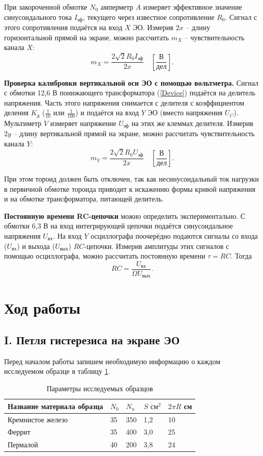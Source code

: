 \documentclass[a4paper,10pt]{article}
\begin{document}
При закороченной обмотке $N_0$ амперметр $A$ измеряет эффективное значение синусоидального тока $I_{\text{эф}}$, текущего через известное сопротивление $R_0$. Сигнал с этого сопротивления подаётся на вход $X$ ЭО. Измерив $2x$ -- длину горизонтальной прямой на экране, можно рассчитать $m_X$ -- чувствительность канала $X$:\[m_X=\frac{2\sqrt2R_0I_{\text{эф}}}{2x}\quad\left[\frac{\text{В}}{\text{дел}}\right].\]

\textbf{Проверка калибровки вертикальной оси ЭО с помощью вольтметра.} Сигнал с обмотки 12,6 В понижающего трансформатора (\ref{Device}) подаётся на делитель напряжения. Часть этого напряжения снимается с делителя с коэффициентом деления $K_{\text{д}}$ ($\frac{1}{10}$ или $\frac{1}{100}$) и подаётся на вход $Y$ ЭО (вместо напряжения $U_C$). Мультиметр $V$ измеряет напряжение $U_{\text{эф}}$ на этих же клеммах делителя. Измерив $2y$ -- длину вертикальной прямой на экране, можно рассчитать чувствительность канала $Y$:\[m_Y=\frac{2\sqrt2R_0U_{\text{эф}}}{2x}\quad\left[\frac{\text{В}}{\text{дел}}\right].\]

При этом тороид должен быть отключен, так как несинусоидальный ток нагрузки в первичной обмотке тороида приводит к искажению формы кривой напряжения и на обмотке трансформатора, питающей делитель.

\textbf{Постоянную времени RC-цепочки} можно определить экспериментально. С обмотки 6,3 В на вход интегрирующей цепочки подаётся синусоидальное напряжения $U_{\text{вх}}$. На вход $Y$ осциллографа поочерёдно подаются сигналы со входа ($U_{\text{вх}}$) и выхода ($U_{\text{вых}}$) $RC$-цепочки. Измерив амплитуды этих сигналов с помощью осциллографа, можно рассчитать постоянную времени $\tau=RC$. Тогда\[RC=\frac{U_{\text{вх}}}{\Omega U_{\text{вых}}}.\]

\section*{Ход работы}

\subsection*{I. Петля гистерезиса на экране ЭО}
Перед началом работы запишем необходимую информацию о каждом исследуемом образце в таблицу \ref{data}.

\begin{table}[h!]
	\centering
	\caption{Параметры исследуемых образцов} \label{data}
	\begin{tabular}{|l|l|l|l|l|}
		\hline
		Название материала образца & $N_0$ & $N_u$ & $S \text{ см}^2$  & $2\pi R$ см \\ \hline
		Кремнистое железо          & 35 & 350 & 1,2 & 10 \\ \hline
		Феррит                     & 35 & 400 & 3,0 & 25 \\ \hline
		Пермалой                   & 40 & 200 & 3,8 & 24 \\ \hline
	\end{tabular}
\end{table}
\end{document}

